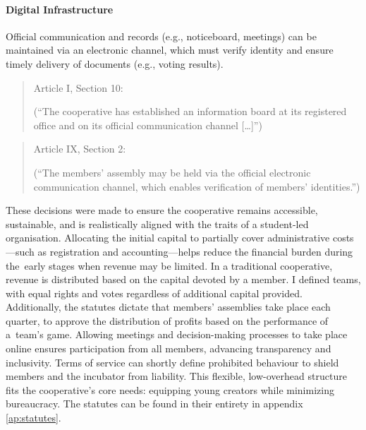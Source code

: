 \paragraph{Digital Infrastructure}
Official communication and records (e.g., noticeboard, meetings) can be maintained via an electronic channel, which must verify identity and ensure timely delivery of documents (e.g., voting results).
\begin{quote}
    Article I, Section 10: 

    (\enquote{The cooperative has established an information board at its registered office and on its official communication channel […]})
\end{quote}
\begin{quote}
    Article IX, Section 2: 

    (\enquote{The members’ assembly may be held via the official electronic communication channel, which enables verification of members’ identities.})
\end{quote}

These decisions were made to ensure the cooperative remains accessible, sustainable, and is realistically aligned with the traits of a student-led organisation. Allocating the initial capital to partially cover administrative costs---such as registration and accounting---helps reduce the financial burden during the~early stages when revenue may be limited. In a traditional cooperative, revenue is distributed based on the capital devoted by a member. I defined teams, with equal rights and votes regardless of additional capital provided. Additionally, the statutes dictate that members’ assemblies take place each quarter, to approve the distribution of profits  based on the performance of a~team’s game. Allowing meetings and decision-making processes to take place online ensures participation from all members, advancing transparency and inclusivity. Terms of service can shortly define prohibited behaviour to shield members and the incubator from liability. This flexible, low-overhead structure fits the cooperative's core needs: equipping young creators while minimizing bureaucracy. The statutes can be found in their entirety in appendix \ref{ap:statutes}.

